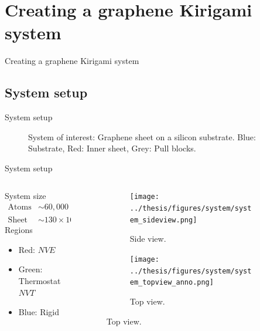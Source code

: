\documentclass[
	10pt, %
]{beamer}
\begin{document}
\section{Creating a graphene Kirigami system} %
\begin{frame}{Creating a graphene Kirigami system}
    \tableofcontents[currentsection]
\end{frame}


\subsection{System setup}
\begin{frame}{System setup}
	\begin{figure}
		\centering    
		\caption{System of interest: Graphene sheet on a silicon substrate. Blue: Substrate, Red: Inner sheet, Grey: Pull blocks. }
	\end{figure} 
\end{frame}
%
%
\begin{frame}{System setup}
	\begin{columns} 
		\hspace{5mm}
		\begin{column}{.4\textwidth}
			System size
			\begin{align*}
				\text{Atoms} &\sim 60,000 \\
				\text{Sheet} &\sim 130 \times \SI{165}{Å} 
			\end{align*}
			Regions
			\begin{itemize}
				\item Red: $NVE$
				\item Green: Thermostat $NVT$
				\item Blue: Rigid 
			\end{itemize}
		\end{column}
		\begin{column}{.5\textwidth}
			\begin{figure}[H]
				\raggedright
				\begin{subfigure}[b]{0.9\textwidth}
					\centering
					\texttt{[image: ../thesis/figures/system/system\_sideview.png]}
					\caption{Side view.}
				\end{subfigure}
				\begin{subfigure}[b]{0.9\textwidth}
					\centering
					\texttt{[image: ../thesis/figures/system/system\_topview\_anno.png]}
					\caption{Top view.}
				\end{subfigure}
			\end{figure}
		\end{column}%
	\end{columns}


	
\end{frame}
%
%
\end{document}
